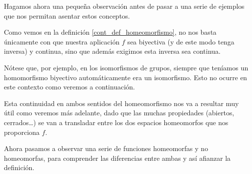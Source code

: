 Hagamos ahora una pequeña observación antes de pasar a una serie de ejemplos que nos permitan asentar estos conceptos.

\begin{obs}
	\label{cont_obs_defHomeomorfismo}
	Como vemos en la definición \ref{cont_def_homeomorfismo}, no nos basta únicamente con que nuestra aplicación $f$ sea biyectiva (y de este modo tenga inversa) y continua, sino que además exigimos esta inversa sea continua. 
	
	Nótese que, por ejemplo, en los isomorfismos de grupos, siempre que teníamos un homomorfismo biyectivo automáticamente era un isomorfismo. Esto no ocurre en este contexto como veremos a continuación.
	
	Esta continuidad en ambos sentidos del homeomorfismo nos va a resultar muy útil como veremos más adelante, dado que las muchas propiedades (abiertos, cerrados\dots) se van a transladar entre los dos espacios homeomorfos que nos proporciona $f$.
\end{obs}

Ahora pasamos a observar una serie de funciones homeomorfas y no homeomorfas, para comprender las diferencias entre ambas y así afianzar la definición.

